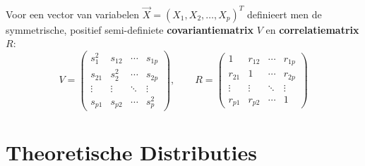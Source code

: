 \documentclass[11pt,a4paper]{article}
\begin{document}
Voor een vector van variabelen $\vec{X} = (X_1, X_2, \ldots, X_p)^T$ definieert men de symmetrische, positief semi-definiete \textbf{covariantiematrix} $V$ en \textbf{correlatiematrix} $R$:
\begin{equation}
    V = \begin{pmatrix}
        s_1^2 & s_{12} & \cdots & s_{1p} \\
        s_{21} & s_2^2 & \cdots & s_{2p} \\
        \vdots & \vdots & \ddots & \vdots \\
        s_{p1} & s_{p2} & \cdots & s_p^2
    \end{pmatrix}, \qquad
    R = \begin{pmatrix}
        1 & r_{12} & \cdots & r_{1p} \\
        r_{21} & 1 & \cdots & r_{2p} \\
        \vdots & \vdots & \ddots & \vdots \\
        r_{p1} & r_{p2} & \cdots & 1
    \end{pmatrix}
\end{equation}


\section{Theoretische Distributies}
\end{document}
